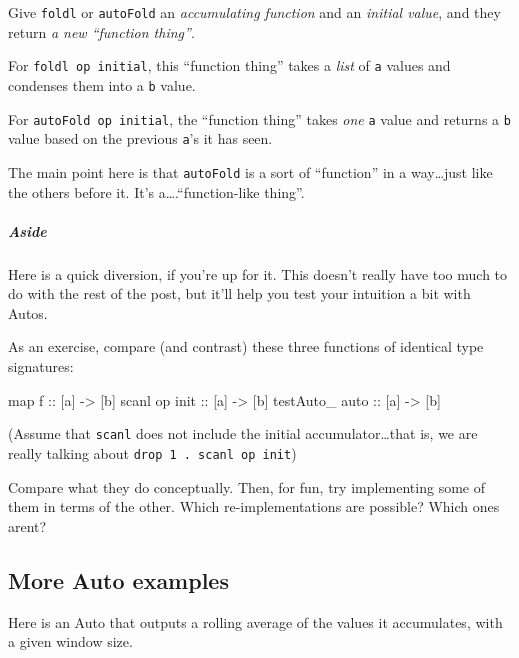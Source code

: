 \documentclass[]{article}
\newenvironment{Shaded}{}{}
\newcommand{\OtherTok}[1]{\textcolor[rgb]{0.00,0.44,0.13}{{#1}}}
\newcommand{\NormalTok}[1]{{#1}}
\begin{document}
Give \texttt{foldl} or \texttt{autoFold} an \emph{accumulating function}
and an \emph{initial value}, and they return \emph{a new ``function
thing''}.

For \texttt{foldl\ op\ initial}, this ``function thing'' takes a
\emph{list} of \texttt{a} values and condenses them into a \texttt{b}
value.

For \texttt{autoFold\ op\ initial}, the ``function thing'' takes
\emph{one} \texttt{a} value and returns a \texttt{b} value based on the
previous \texttt{a}'s it has seen.

The main point here is that \texttt{autoFold} is a sort of ``function''
in a way\ldots{}just like the others before it. It's
a\ldots{}.``function-like thing''.

\subparagraph{Aside}\label{aside}

Here is a quick diversion, if you're up for it. This doesn't really have
too much to do with the rest of the post, but it'll help you test your
intuition a bit with Autos.

As an exercise, compare (and contrast) these three functions of
identical type signatures:

\begin{Shaded}
\begin{Highlighting}[]
\NormalTok{map}\OtherTok{       f       ::} \NormalTok{[a] }\OtherTok{->} \NormalTok{[b]}
\NormalTok{scanl     op}\OtherTok{ init ::} \NormalTok{[a] }\OtherTok{->} \NormalTok{[b]}
\NormalTok{testAuto_}\OtherTok{ auto    ::} \NormalTok{[a] }\OtherTok{->} \NormalTok{[b]}
\end{Highlighting}
\end{Shaded}

(Assume that \texttt{scanl} does not include the initial
accumulator\ldots{}that is, we are really talking about
\texttt{drop\ 1\ .\ scanl\ op\ init})

Compare what they do conceptually. Then, for fun, try implementing some
of them in terms of the other. Which re-implementations are possible?
Which ones arent?

\subsection{More Auto examples}\label{more-auto-examples}

Here is an Auto that outputs a rolling average of the values it
accumulates, with a given window size.
\end{document}
